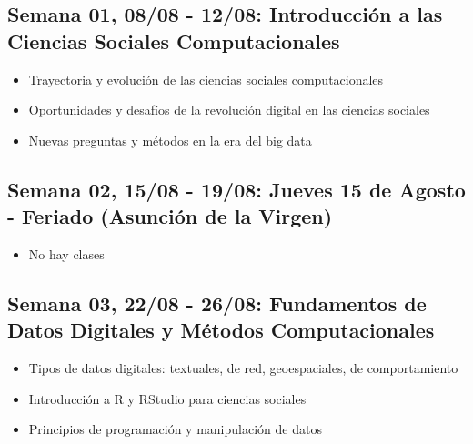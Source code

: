\documentclass[11pt,letter,]{article}
\providecommand{\tightlist}{%
  \setlength{\itemsep}{0pt}\setlength{\parskip}{0pt}}
\begin{document}
\hypertarget{semana-01-0808---1208-introducciuxf3n-a-las-ciencias-sociales-computacionales}{%
\subsection{Semana 01, 08/08 - 12/08: Introducción a las Ciencias
Sociales
Computacionales}\label{semana-01-0808---1208-introducciuxf3n-a-las-ciencias-sociales-computacionales}}

\begin{itemize}
\tightlist
\item
  Trayectoria y evolución de las ciencias sociales computacionales
\item
  Oportunidades y desafíos de la revolución digital en las ciencias
  sociales
\item
  Nuevas preguntas y métodos en la era del big data
\end{itemize}

\hypertarget{semana-02-1508---1908-jueves-15-de-agosto---feriado-asunciuxf3n-de-la-virgen}{%
\subsection{Semana 02, 15/08 - 19/08: Jueves 15 de Agosto - Feriado
(Asunción de la
Virgen)}\label{semana-02-1508---1908-jueves-15-de-agosto---feriado-asunciuxf3n-de-la-virgen}}

\begin{itemize}
\tightlist
\item
  No hay clases
\end{itemize}

\hypertarget{semana-03-2208---2608-fundamentos-de-datos-digitales-y-muxe9todos-computacionales}{%
\subsection{Semana 03, 22/08 - 26/08: Fundamentos de Datos Digitales y
Métodos
Computacionales}\label{semana-03-2208---2608-fundamentos-de-datos-digitales-y-muxe9todos-computacionales}}

\begin{itemize}
\tightlist
\item
  Tipos de datos digitales: textuales, de red, geoespaciales, de
  comportamiento
\item
  Introducción a R y RStudio para ciencias sociales
\item
  Principios de programación y manipulación de datos
\end{itemize}
\end{document}
